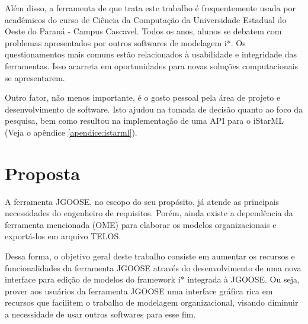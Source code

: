             Além disso,
            a ferramenta de que trata este trabalho
            é frequentemente usada por acadêmicos do curso de Ciência da Computação da Universidade Estadual do Oeste do Paraná - Campus Cascavel.
            Todos os anos, alunos se debatem com problemas apresentados por outros softwares de modelagem i*.
            Os questionamentos mais comuns estão relacionados à usabilidade e integridade das ferramentas.
            Isso acarreta em oportunidades para novas soluções computacionais se apresentarem.

            Outro fator, não menos importante,
            é o gosto pessoal pela área de projeto e desenvolvimento de software.
            Isto ajudou na tomada de decisão quanto ao foco da pesquisa, bem como resultou na implementação de uma API para o iStarML (Veja o apêndice \ref{apendice:istarml}).
    \section{Proposta}
        \label{cap:introducao:sec:proposta}
            A ferramenta JGOOSE,
            no escopo do seu propósito,
            já atende as principais necessidades do engenheiro de requisitos.
            Porém, ainda existe a dependência da ferramenta mencionada (OME)
            para elaborar os modelos organizacionais e exportá-los em arquivo TELOS.

            Dessa forma, o objetivo geral deste trabalho consiste em
            aumentar os recursos e funcionalidades da ferramenta JGOOSE através do
            desenvolvimento de uma nova interface para edição de modelos do framework i* integrada à JGOOSE.
            Ou seja, prover aos usuários da ferramenta JGOOSE uma interface gráfica rica em recursos que facilitem o trabalho de modelagem organizacional, visando diminuir a necessidade de usar outros softwares para esse fim.
            
